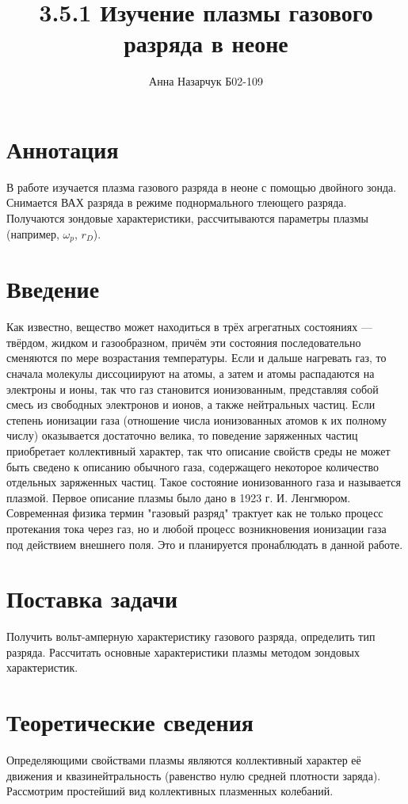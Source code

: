 \documentclass[a4paper,12pt]{article} %
\author{Анна Назарчук Б02-109}
\title{3.5.1 Изучение плазмы газового разряда в неоне}
\date{}
\begin{document}
\maketitle
\section{Аннотация}
В работе изучается плазма газового разряда в неоне с помощью двойного зонда. Снимается ВАХ разряда в режиме поднормального тлеющего разряда. Получаются зондовые характеристики, рассчитываются параметры плазмы (например, $\omega_p$, $r_D$).


\section{Введение}
Как известно, вещество может находиться в трёх агрегатных состояниях
— твёрдом, жидком и газообразном, причём эти состояния последовательно
сменяются по мере возрастания температуры. Если и дальше
нагревать газ, то сначала молекулы диссоциируют на атомы, а затем и
атомы распадаются на электроны и ионы, так что газ становится ионизованным,
представляя собой смесь из свободных электронов и ионов,
а также нейтральных частиц. Если степень ионизации газа (отношение
числа ионизованных атомов к их полному числу) оказывается достаточно
велика, то поведение заряженных частиц приобретает коллективный характер,
так что описание свойств среды не может быть сведено к описанию
обычного газа, содержащего некоторое количество отдельных заряженных
частиц. Такое состояние ионизованного газа и называется плазмой. Первое описание плазмы было дано в 1923 г. И. Ленгмюром. Современная физика термин "газовый разряд" трактует как не только процесс протекания тока через газ, но и любой процесс возникновения ионизации газа под действием внешнего поля. Это и планируется пронаблюдать в данной работе.

\section{Поставка задачи}
Получить вольт-амперную характеристику газового разряда, определить тип разряда. Рассчитать основные характеристики плазмы методом зондовых характеристик.


\section{Теоретические сведения}
Определяющими свойствами плазмы являются коллективный характер
её движения и квазинейтральность (равенство нулю средней плотности
заряда). Рассмотрим простейший вид коллективных плазменных
колебаний.
\end{document}
